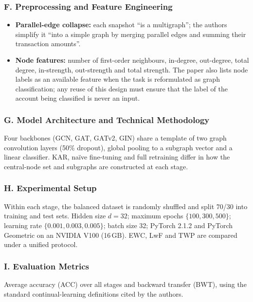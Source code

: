 \documentclass[11pt,a4paper]{article}
\begin{document}
\subsubsection*{F. Preprocessing and Feature Engineering}
\begin{itemize}[leftmargin=*]
    \item \textbf{Parallel-edge collapse:} each snapshot ``is a multigraph''; the authors simplify it ``into a simple graph by merging parallel edges and summing their transaction amounts''.
    \item \textbf{Node features:} number of first-order neighbours, in-degree, out-degree, total degree, in-strength, out-strength and total strength. The paper also lists node labels as an available feature when the task is reformulated as graph classification; any reuse of this design must ensure that the label of the account being classified is never an input.
\end{itemize}

\subsubsection*{G. Model Architecture and Technical Methodology}
Four backbones (GCN, GAT, GATv2, GIN) share a template of two graph convolution layers (50\% dropout), global pooling to a subgraph vector and a linear classifier. KAR, naïve fine-tuning and full retraining differ in how the central-node set and subgraphs are constructed at each stage.

\subsubsection*{H. Experimental Setup}
Within each stage, the balanced dataset is randomly shuffled and split 70/30 into training and test sets. Hidden size $d=32$; maximum epochs $\{100, 300, 500\}$; learning rate $\{0.001, 0.003, 0.005\}$; batch size 32; PyTorch 2.1.2 and PyTorch Geometric on an NVIDIA V100 (16\,GB). EWC, LwF and TWP are compared under a unified protocol.

\subsubsection*{I. Evaluation Metrics}
Average accuracy (ACC) over all stages and backward transfer (BWT), using the standard continual-learning definitions cited by the authors.
\end{document}

